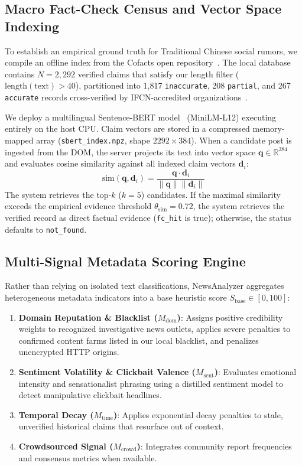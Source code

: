 \documentclass[twoside]{llncs}
\begin{document}
\subsection{Macro Fact-Check Census and Vector Space Indexing}
To establish an empirical ground truth for Traditional Chinese social rumors, we compile an offline index from the Cofacts open repository~\cite{cofacts2020, lim2023factchecking}. The local database contains $N=2{,}292$ verified claims that satisfy our length filter ($\text{length}(\text{text}) > 40$), partitioned into 1,817 \texttt{inaccurate}, 208 \texttt{partial}, and 267 \texttt{accurate} records cross-verified by IFCN-accredited organizations~\cite{ifcn2020, tfc2023}.

We deploy a multilingual Sentence-BERT model~\cite{reimers2019sbert} (MiniLM-L12) executing entirely on the host CPU. Claim vectors are stored in a compressed memory-mapped array (\texttt{sbert\_index.npz}, shape $2292 \times 384$). When a candidate post is ingested from the DOM, the server projects its text into vector space $\mathbf{q} \in \mathbb{R}^{384}$ and evaluates cosine similarity against all indexed claim vectors $\mathbf{d}_i$:
\begin{equation}
\text{sim}(\mathbf{q}, \mathbf{d}_i) = \frac{\mathbf{q} \cdot \mathbf{d}_i}{\|\mathbf{q}\| \|\mathbf{d}_i\|}
\end{equation}
The system retrieves the top-$k$ ($k=5$) candidates. If the maximal similarity exceeds the empirical evidence threshold $\theta_{\text{sim}} = 0.72$, the system retrieves the verified record as direct factual evidence (\texttt{fc\_hit} is true); otherwise, the status defaults to \texttt{not\_found}.

\subsection{Multi-Signal Metadata Scoring Engine}
Rather than relying on isolated text classifications, NewsAnalyzer aggregates heterogeneous metadata indicators into a base heuristic score $S_{\text{base}} \in [0, 100]$:
\begin{enumerate}
  \item \textbf{Domain Reputation \& Blacklist ($M_{\text{dom}}$)}: Assigns positive credibility weights to recognized investigative news outlets, applies severe penalties to confirmed content farms listed in our local blacklist, and penalizes unencrypted HTTP origins.
  \item \textbf{Sentiment Volatility \& Clickbait Valence ($M_{\text{sent}}$)}: Evaluates emotional intensity and sensationalist phrasing using a distilled sentiment model to detect manipulative clickbait headlines.
  \item \textbf{Temporal Decay ($M_{\text{time}}$)}: Applies exponential decay penalties to stale, unverified historical claims that resurface out of context.
  \item \textbf{Crowdsourced Signal ($M_{\text{crowd}}$)}: Integrates community report frequencies and consensus metrics when available.
\end{enumerate}
\end{document}
